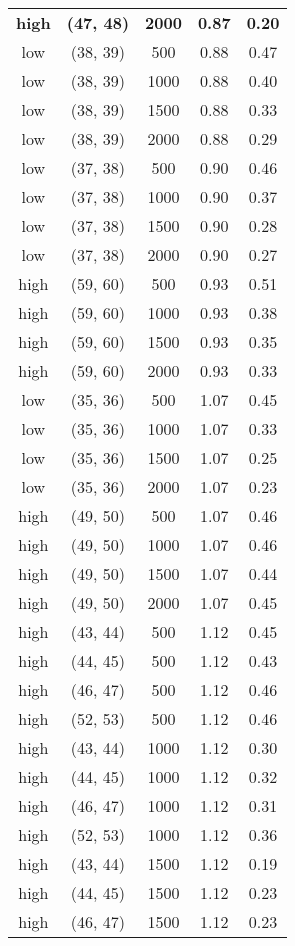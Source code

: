 \begin{tabular}{c c c c c}
\textbf{high} & \textbf{(47, 48)} & \textbf{ 2000} & \textbf{0.87} & \textbf{0.20} \\
low & (38, 39) &  500 & 0.88 & 0.47 \\
low & (38, 39) &  1000 & 0.88 & 0.40 \\
low & (38, 39) &  1500 & 0.88 & 0.33 \\
low & (38, 39) &  2000 & 0.88 & 0.29 \\
low & (37, 38) &  500 & 0.90 & 0.46 \\
low & (37, 38) &  1000 & 0.90 & 0.37 \\
low & (37, 38) &  1500 & 0.90 & 0.28 \\
low & (37, 38) &  2000 & 0.90 & 0.27 \\
high & (59, 60) &  500 & 0.93 & 0.51 \\
high & (59, 60) &  1000 & 0.93 & 0.38 \\
high & (59, 60) &  1500 & 0.93 & 0.35 \\
high & (59, 60) &  2000 & 0.93 & 0.33 \\
low & (35, 36) &  500 & 1.07 & 0.45 \\
low & (35, 36) &  1000 & 1.07 & 0.33 \\
low & (35, 36) &  1500 & 1.07 & 0.25 \\
low & (35, 36) &  2000 & 1.07 & 0.23 \\
high & (49, 50) &  500 & 1.07 & 0.46 \\
high & (49, 50) &  1000 & 1.07 & 0.46 \\
high & (49, 50) &  1500 & 1.07 & 0.44 \\
high & (49, 50) &  2000 & 1.07 & 0.45 \\
high & (43, 44) &  500 & 1.12 & 0.45 \\
high & (44, 45) &  500 & 1.12 & 0.43 \\
high & (46, 47) &  500 & 1.12 & 0.46 \\
high & (52, 53) &  500 & 1.12 & 0.46 \\
high & (43, 44) &  1000 & 1.12 & 0.30 \\
high & (44, 45) &  1000 & 1.12 & 0.32 \\
high & (46, 47) &  1000 & 1.12 & 0.31 \\
high & (52, 53) &  1000 & 1.12 & 0.36 \\
high & (43, 44) &  1500 & 1.12 & 0.19 \\
high & (44, 45) &  1500 & 1.12 & 0.23 \\
high & (46, 47) &  1500 & 1.12 & 0.23 \\

\end{tabular}
